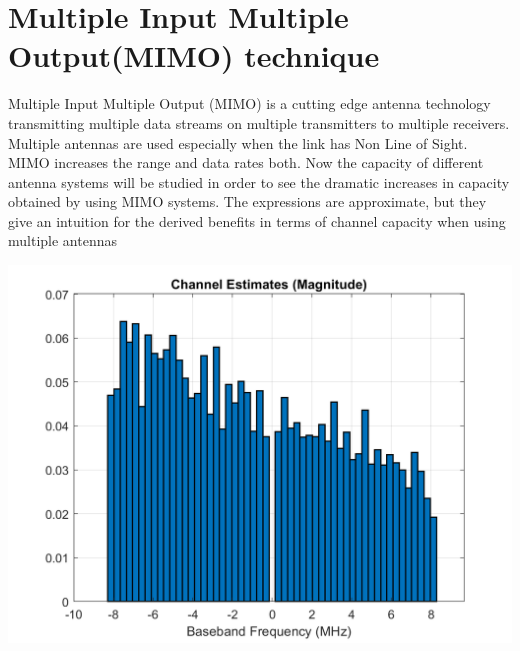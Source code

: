 \documentclass[12pt]{report}
\begin{document}
\section*{Multiple Input Multiple Output(MIMO) technique}
Multiple Input Multiple Output (MIMO) is a cutting edge antenna
technology transmitting multiple data streams on multiple transmitters
to multiple receivers. Multiple antennas are used especially when
the link has Non Line of Sight. MIMO increases the range and data
rates both.
Now the capacity of different antenna systems will be studied in order
to see the dramatic increases in capacity obtained by using MIMO systems. The expressions are approximate, but they give an intuition for
the derived benefits in terms of channel capacity when using multiple
antennas

\includegraphics[width=\columnwidth]{channel_est.png}
\end{document}
